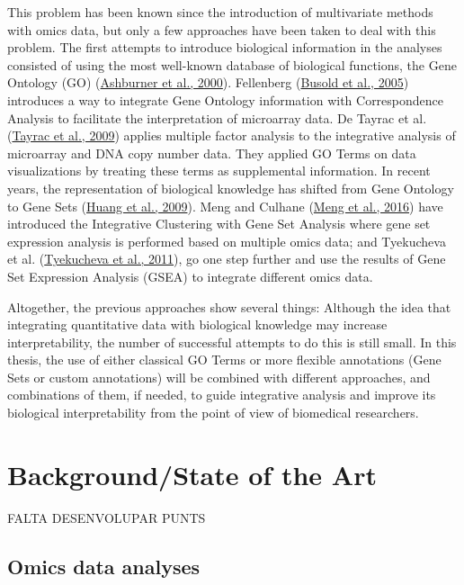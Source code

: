 \documentclass[a4paper, nobind]{templates/ociamthesis}
\begin{document}
This problem has been known since the introduction of multivariate methods with omics data, but only a few approaches have been taken to deal with this problem. The first attempts to introduce biological information in the analyses consisted of using the most well-known database of biological functions, the Gene Ontology (GO) (\protect\hyperlink{ref-ashburner_gene_2000}{Ashburner et al., 2000}). Fellenberg (\protect\hyperlink{ref-busold_integration_2005}{Busold et al., 2005}) introduces a way to integrate Gene Ontology information with Correspondence Analysis to facilitate the interpretation of microarray data. De Tayrac et al. (\protect\hyperlink{ref-de_tayrac_simultaneous_2009}{Tayrac et al., 2009}) applies multiple factor analysis to the integrative analysis of microarray and DNA copy number data. They applied GO Terms on data visualizations by treating these terms as supplemental information. In recent years, the representation of biological knowledge has shifted from Gene Ontology to Gene Sets (\protect\hyperlink{ref-huang_bioinformatics_2009}{Huang et al., 2009}). Meng and Culhane (\protect\hyperlink{ref-meng_dimension_2016}{Meng et al., 2016}) have introduced the Integrative Clustering with Gene Set Analysis where gene set expression analysis is performed based on multiple omics data; and Tyekucheva et al. (\protect\hyperlink{ref-tyekucheva_integrating_2011}{Tyekucheva et al., 2011}), go one step further and use the results of Gene Set Expression Analysis (GSEA) to integrate different omics data.

Altogether, the previous approaches show several things: Although the idea that integrating quantitative data with biological knowledge may increase interpretability, the number of successful attempts to do this is still small. In this thesis, the use of either classical GO Terms or more flexible annotations (Gene Sets or custom annotations) will be combined with different approaches, and combinations of them, if needed, to guide integrative analysis and improve its biological interpretability from the point of view of biomedical researchers.

\hypertarget{backgroundstate-of-the-art}{%
\section{Background/State of the Art}\label{backgroundstate-of-the-art}}

FALTA DESENVOLUPAR PUNTS

\hypertarget{omics-data-analyses}{%
\subsection{Omics data analyses}\label{omics-data-analyses}}
\end{document}
